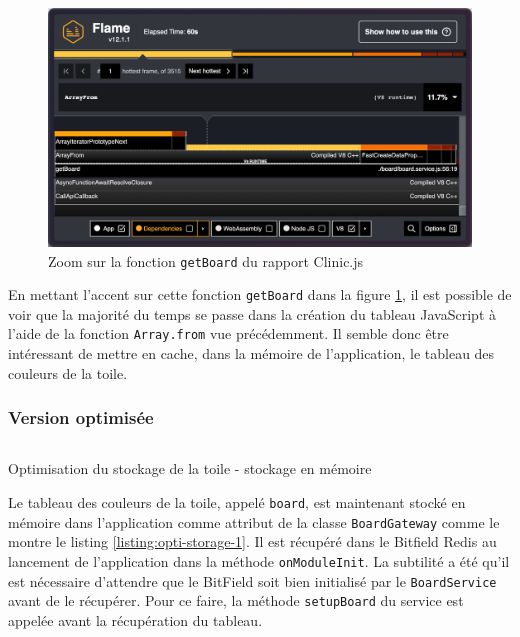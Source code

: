\begin{figure}[H]
  \centering
  \includegraphics[width=1\textwidth]{./assets/figures/flame/flame3-getBoard.png}
  \caption{Zoom sur la fonction \texttt{getBoard} du rapport Clinic.js}
  \label{fig:flame3-getBoard}
\end{figure}

En mettant l'accent sur cette fonction \texttt{getBoard} dans la figure \ref{fig:flame3-getBoard}, il est possible de voir que la majorité du temps se passe dans la création du tableau JavaScript à l'aide de la fonction \texttt{Array.from} vue précédemment. Il semble donc être intéressant de mettre en cache, dans la mémoire de l'application, le tableau des couleurs de la toile.

\subsubsection{Version optimisée}

\begin{listing}[H]
  \inputminted[highlightlines={4,10,11},linenos]{ts}{assets/figures/opti-storage-1.ts}
  \caption{Optimisation du stockage de la toile - stockage en mémoire}
  \label{listing:opti-storage-1}
\end{listing}

Le tableau des couleurs de la toile, appelé \texttt{board}, est maintenant stocké en mémoire dans l'application comme attribut de la classe \texttt{BoardGateway} comme le montre le listing \ref{listing:opti-storage-1}. Il est récupéré dans le Bitfield Redis au lancement de l'application dans la méthode \texttt{onModuleInit}. La subtilité a été qu'il est nécessaire d'attendre que le BitField soit bien initialisé par le \texttt{BoardService} avant de le récupérer. Pour ce faire, la méthode \texttt{setupBoard} du service est appelée avant la récupération du tableau.

